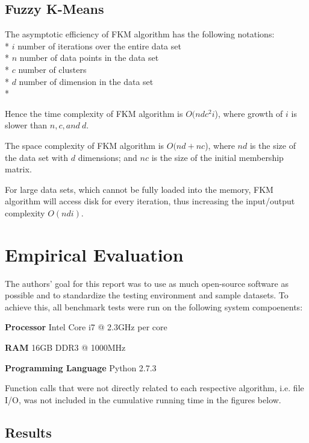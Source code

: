 \documentclass[conference, 10pt]{IEEEtran}
\begin{document}
\subsection{Fuzzy K-Means}
The asymptotic efficiency of FKM algorithm has the following notations:\\*
$i$ number of iterations over the entire data set\\*
$n$ number of data points in the data set\\*
$c$ number of clusters\\*
$d$ number of dimension in the data set\\*

Hence the time complexity of FKM algorithm is $O(ndc^2i$), where growth of $i$ is slower than $n, c, and\:d$.

The space complexity of FKM algorithm is $O(nd+nc$), where $nd$ is the size of the data set with $d$ dimensions; and $nc$ is the size of the initial membership matrix.

For large data sets, which cannot be fully loaded into the memory, FKM algorithm will access
disk for every iteration, thus increasing the input/output complexity $O(ndi)$.


\section{Empirical Evaluation}
The authors' goal for this report was to use as much open-source software as possible and to standardize the testing environment and sample datasets. To achieve this, all benchmark tests were run on the following system compoenents:

\begin{description}
  \item{\textbf{Processor}} Intel Core i7 @ 2.3GHz per core
  \item{\textbf{RAM}} 16GB DDR3 @ 1000MHz
  \item{\textbf{Programming Language}} Python 2.7.3
\end{description} 
Function calls that were not directly related to each respective algorithm, i.e. file I/O, was not included in the cumulative running time in the figures below.

\subsection{Results}
\end{document}
